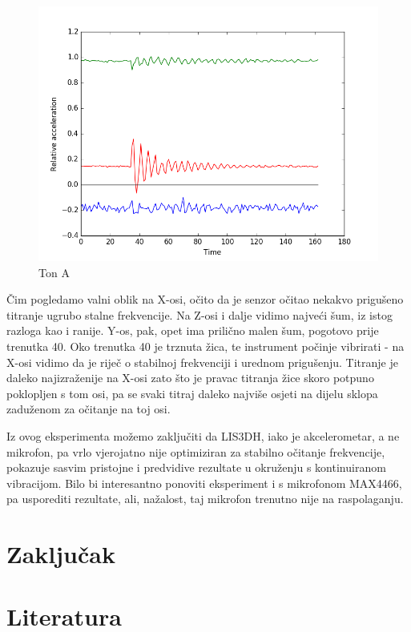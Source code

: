 \documentclass[12pt,a4paper]{article}
\begin{document}
	\begin{figure}[h!]
	  \includegraphics[width=\linewidth]{slike/bass3.png}
	  \caption{Ton A}
	  \label{fig:bass3}
	\end{figure}

	Čim pogledamo valni oblik na X-osi, očito da je senzor očitao nekakvo prigušeno titranje ugrubo stalne frekvencije. Na Z-osi i dalje vidimo najveći šum, iz istog razloga kao i ranije. Y-os, pak, opet ima prilično malen šum, pogotovo prije trenutka 40. Oko trenutka 40 je trznuta žica, te instrument počinje vibrirati - na X-osi vidimo da je riječ o stabilnoj frekvenciji i urednom prigušenju. Titranje je daleko najizraženije na X-osi zato što je pravac titranja žice skoro potpuno poklopljen s tom osi, pa se svaki titraj daleko najviše osjeti na dijelu sklopa zaduženom za očitanje na toj osi.
	\par Iz ovog eksperimenta možemo zaključiti da LIS3DH, iako je akcelerometar, a ne mikrofon, pa vrlo vjerojatno nije optimiziran za stabilno očitanje frekvencije, pokazuje sasvim pristojne i predvidive rezultate u okruženju s kontinuiranom vibracijom. Bilo bi interesantno ponoviti eksperiment i s mikrofonom MAX4466, pa usporediti rezultate, ali, nažalost, taj mikrofon trenutno nije na raspolaganju.



\newpage
\section{Zaključak}

\newpage
\section{Literatura}
\end{document}
